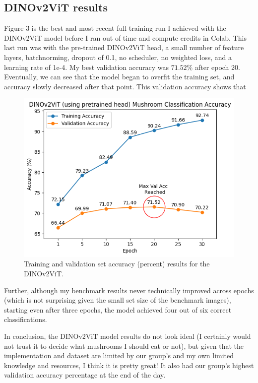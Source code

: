 \documentclass[journal]{IEEEtran}
\begin{document}
\subsection{DINOv2ViT results}
Figure 3 is the best and most recent full training run I achieved with the DINOv2ViT model before I ran out of time and compute credits in Colab. This last run was with the pre-trained DINOv2ViT head, a small number of feature layers, batchnorming, dropout of 0.1, no scheduler, no weighted loss, and a learning rate of 1e-4. My best validation accuracy was $71.52\%$ after epoch 20. Eventually, we can see that the model began to overfit the training set, and accuracy slowly decreased after that point. This validation accuracy shows that 
  \begin{figure}
    \includegraphics[width=\linewidth]{imgs/Krech_DINOv2ViT_Results_Plot.png}
    \caption{Training and validation set accuracy (percent) results for the DINOv2ViT.}
  \end{figure}

Further, although my benchmark results never technically improved across epochs (which is not surprising given the small set size of the benchmark images), starting even after three epochs, the model achieved four out of six correct classifications.

In conclusion, the DINOv2ViT model results do not look ideal (I certainly would not trust it to decide what mushrooms I should eat or not), but given that the implementation and dataset are limited by our group's and my own limited knowledge and resources, I think it is pretty great! It also had our group's highest validation accuracy percentage at the end of the day. 
\end{document}
